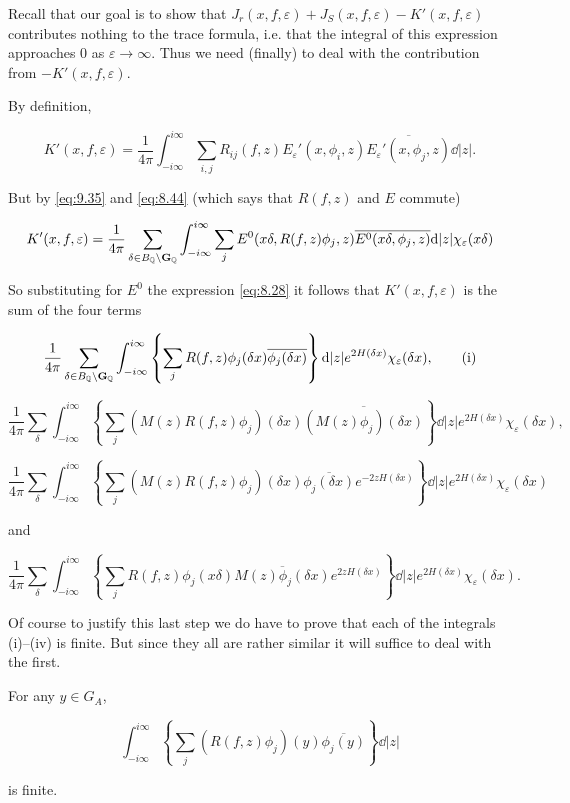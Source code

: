 Recall that our goal is to show that $J_r(x,f,\varepsilon) + J_S(x,f,\varepsilon) - K'(x,f,\varepsilon)$ contributes nothing to the trace formula, i.e. that the integral of this expression approaches 0 as $\varepsilon \to \infty$. Thus we need (finally) to deal with the contribution from $-K'(x,f,\varepsilon)$.

By definition,

\[
K'(x, f, \varepsilon) = \frac{1}{4\pi}\int_{-i\infty}^{i\infty}\sum_{i, j} R_{ij}(f, z)E_\varepsilon'(x, \phi_i, z)\overline{E_\varepsilon'(x, \phi_j, z)}\dd|z|.
\]

But by \eqref{eq:9.35} and \eqref{eq:8.44} (which says that $R(f,z)$ and $E$ commute)

\[
K'(x, f, \varepsilon) = \frac{1}{4\pi}\sum_{\delta \in B_{\mathbb{Q}} \backslash \mathbf{G}_{\mathbb{Q}}}\int_{-i\infty}^{i\infty}\sum_j E^0(x\delta, R(f, z)\phi_j, z)\overline{E^0(x\delta, \phi_j, z)}\mathrm{d}|z|\chi_\varepsilon(x\delta)
\]

So substituting for $E^0$ the expression \eqref{eq:8.28} it follows that $K'(x, f, \varepsilon)$ is the sum of the four terms

\[
\frac{1}{4\pi}\sum_{\delta \in B_{\mathbb{Q}} \backslash \mathbf{G}_{\mathbb{Q}}}\int_{-i\infty}^{i\infty}\left\{\sum_j R(f, z)\phi_j(\delta x)\overline{\phi_j(\delta x)}\right\}\mathrm{d}|z|e^{2H(\delta x)}\chi_\varepsilon(\delta x),\tag{i}
\]

\[
\frac{1}{4\pi}\sum_{\delta}\int_{-i\infty}^{i\infty}\left\{\sum_j (M(z)R(f, z)\phi_j)(\delta x)\overline{(M(z)\phi_j)(\delta x)}\right\}\dd|z|e^{2H(\delta x)}\chi_\varepsilon(\delta x),\tag{ii}
\]

\[
\frac{1}{4\pi}\sum_{\delta}\int_{-i\infty}^{i\infty}\left\{\sum_j (M(z)R(f, z)\phi_j)(\delta x)\overline{\phi_j(\delta x)}e^{-2zH(\delta x)}\right\}\dd|z|e^{2H(\delta x)}\chi_\varepsilon(\delta x)\tag{iii}
\]

and

\[
\frac{1}{4\pi}\sum_{\delta}\int_{-i\infty}^{i\infty}\left\{\sum_j R(f, z)\phi_j(x\delta)\overline{M(z)\phi_j(\delta x)}e^{2zH(\delta x)}\right\}\dd|z|e^{2H(\delta x)}\chi_\varepsilon(\delta x).\tag{iv}
\]

Of course to justify this last step we do have to prove that each of the integrals (i)--(iv) is finite. But since they all are rather similar it will suffice to deal with the first.

\begin{lemma}\label{lem:9.14}

For any $y \in G_A$,

\[
\int_{-i\infty}^{i\infty}\left\{\sum_j (R(f, z)\phi_j)(y)\overline{\phi_j(y)}\right\}\dd|z|
\]

is finite.

\end{lemma}

